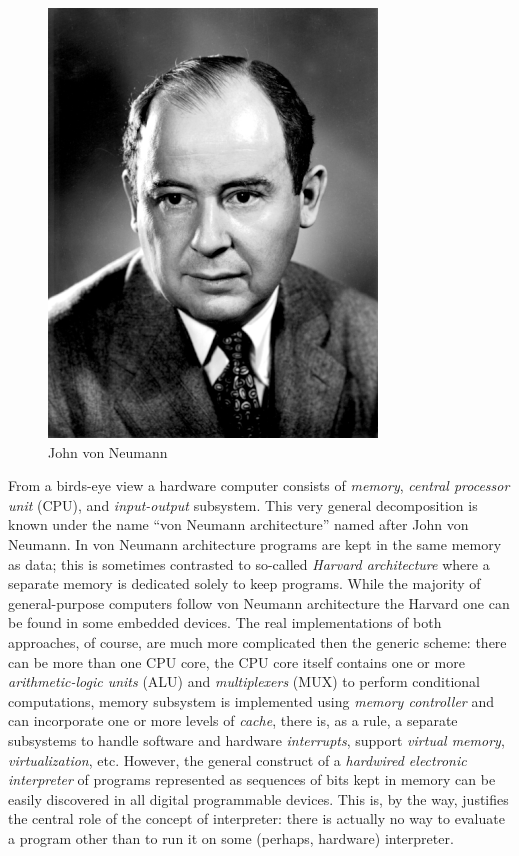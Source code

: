 \begin{figure}[t]
  \centering
  \includegraphics[scale=0.5]{images/JohnvonNeumann.png}
  \caption{John von Neumann}
\end{figure}

From a birds-eye view a hardware computer consists of \emph{memory}, \emph{central processor unit} (CPU), and
\emph{input-output} subsystem. This very general decomposition is known under the name ``von Neumann architecture'' named
after John von Neumann. In von Neumann architecture programs are kept in the same memory as data; this is
sometimes contrasted to so-called \emph{Harvard architecture} where a separate memory is dedicated solely to
keep programs. While the majority of general-purpose computers follow von Neumann architecture the Harvard one can be
found in some embedded devices. The real implementations of both approaches, of course, are much more complicated then
the generic scheme: there can be more than one CPU core, the CPU core itself contains one or more \emph{arithmetic-logic units} (ALU) and
\emph{multiplexers} (MUX) to perform conditional computations, memory subsystem is implemented using \emph{memory controller} and can
incorporate one or more levels of \emph{cache}, there is, as a rule, a separate subsystems to handle software and hardware \emph{interrupts},
support \emph{virtual memory}, \emph{virtualization}, etc. However, the general construct of a \emph{hardwired electronic interpreter}
of programs represented as sequences of bits kept in memory can be easily discovered in all digital programmable devices. This is,
by the way, justifies the central role of the concept of interpreter: there is actually no way to evaluate a program other than
to run it on some (perhaps, hardware) interpreter.

